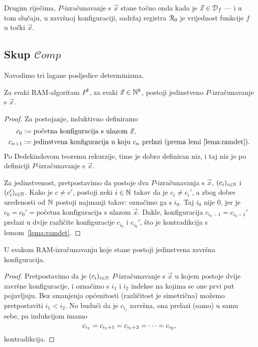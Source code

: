 Drugim riječima, $P$-izračunavanje s $\vec x$ stane točno onda kada je $\vec x\in\mathcal D_{f}$ --- i u tom slučaju, u završnoj konfiguraciji, sadržaj registra $\mathcal R_{0}$ je vrijednost funkcije $f$ u točki $\vec x$.

\subsection{Skup \texorpdfstring{$\mathscr Comp$}{Comp}}

Navodimo tri lagane posljedice determinizma.

\begin{propozicija}[{name=[jedinstvenost izračunavanja]}]\label{prop:ramdet}
Za svaki RAM-algoritam $P^k$, za svaki $\vec x\in{\mathbb N}^k$, postoji jedinstveno $P$-izračunavanje s $\vec x$.
\end{propozicija}
\begin{proof}
Za postojanje, induktivno definiramo
\begin{align}
    c_0&:=\text{početna konfiguracija s ulazom $\vec x$,}\\
    c_{n+1}&:=\text{jedinstvena konfiguracija u koju $c_n$ prelazi (prema lemi~\ref{lema:ramdet}).}
\end{align}
Po Dedekindovom teoremu rekurzije, time je dobro definiran niz, i taj niz je po definiciji $P$-iz\-ra\-ču\-na\-va\-nje s $\vec x$.

Za jedinstvenost, pretpostavimo da postoje dva $P$-izračunavanja s $\vec x$, $(c_i)_{i\in{\mathbb N}}$ i $(c_i')_{i\in{\mathbb N}}$.
Kako je $c\ne c'$, postoji neki $i\in{\mathbb N}$ takav da je $c_i\ne c_i'$, a zbog dobre uređenosti od ${\mathbb N}$ postoji najmanji takav: označimo ga s $i_0$.
Taj $i_0$ nije $0$, jer je $c_0=c_0'=\text{početna konfiguracija s ulazom $\vec x$}$. Dakle, konfiguracija $c_{i_0-1}=c_{i_0-1}'$ prelazi u dvije različite konfiguracije $c_{i_0}$ i $c_{i_0}'$, što je kontradikcija s lemom~\ref{lema:ramdet}.
\end{proof}

\begin{propozicija}[{name=[jedinstvenost završne konfiguracije]}]\label{prop:ram1zav}
U svakom RAM-izračunavanju koje stane postoji jedinstvena završna konfiguracija.
\end{propozicija}
\begin{proof}
Pretpostavimo da je $(c_i)_{i\in{\mathbb N}}$ $P$-izračunavanje s $\vec x$ u kojem postoje dvije završne konfiguracije, i označimo s $i_1$ i $i_2$ indekse na kojima se one prvi put pojavljuju. Bez smanjenja općenitosti (različitost je simetrična) možemo pretpostaviti $i_1<i_2$. No budući da je $c_{i_1}$ završna, ona prelazi (samo) u samu sebe, pa indukcijom imamo
\begin{equation}
    c_{i_1}=c_{i_1+1}=c_{i_1+2}=\dotsb=c_{i_2}\text,
\end{equation}
kontradikcija.
\end{proof}

